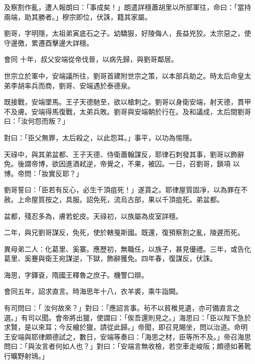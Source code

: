 \begin{pinyinscope}
 及察割作亂，遭人報朗曰：「事成矣！」朗遣詳穩蕭胡里以所部軍往，命曰：「當持兩端，助其勝者。」穆宗即位，伏誅，籍其家屬。



 劉哥，字明隱，太祖弟寅底石之子。幼驕狠，好陵侮人，長益兇狡。太宗惡之，使守邊徼，累遷酉擊邊大詳穩。



 會同
 十年，叔父安端從帝伐晉，以病先歸，與劉哥鄰居。



 世宗立於軍中，安端議所往，劉哥首建附世宗之策，以本部兵助之。時太后命皇太弟李胡率兵而商，劉哥、安端遇於泰德泉。



 既接戰，安端墜馬。王子天德馳至，欲以槍刺之。劉哥以身衛安端，射天德，貫甲不及膚。安端得馬復戰，太弟兵敗。劉哥與安端朝於行在。及和議成，太后間劉哥曰：「汝何怨而叛？」



 對曰：「臣父無罪，太后殺之，以此怨耳。」事平，以功為惕隱。



 天祿中，與其弟盆都、王子天德、侍衛蕭翰謀反，耶律石刺發其事，劉哥以飾辭免。後謂帝博，欲因進酒弒逆，帝覺之，不果，被囚。一日，召劉哥，鎖項
 以博。帝問：「妝實反耶？」



 劉哥誓曰：「臣若有反心，必生千頂疽死！」遂貰之。耶律屋質固凈，以為罪在不赦。上命屋質按之，具服。詔免死，流烏古部，果以千頂疽死。弟盆都。



 盆都，殘忍多為，膚若蛇皮。天祿初，以族屬為皮室詳穩。



 二年，與兄劉哥謀反，免死，使於轄戛斯國。既還，復預察割之亂，陵遲而死。



 異母弟二人：化葛里、奚寨。應歷初，無職任，以族子，甚見優禮。三年，或告化葛里、奚蹇與衛王宛謀逆，下獄，飾辭獲免。四年春，復謀反，伏誅。



 海思，字鐸袞，隋國王釋魯之庶子。機警口辯。



 會同五年，詔求直言。時海思年十八，衣羊裘，乘牛詣闕。



 有司問曰：「
 汝何故來？」對曰：「應詔言事。茍不以貧稚見遺，亦可備直言之選。」有司以聞。會帝將出獵，使謂曰：「俟吾還則見之。」海思曰：「臣以陛下急於求賢，是以來耳；今反繪於獵，請從此歸。」帝聞，即召見賜坐，問以治道。命明王安端與耶律頗德試之，數日，安端等奏曰：「海思之材，臣等所不及。」帝召海思問曰：「與汝言者何如人也？」對曰：「安端言無收檢，若空車走峻阪；頗德如著靴行曠野射鴇。」




\end{pinyinscope}
